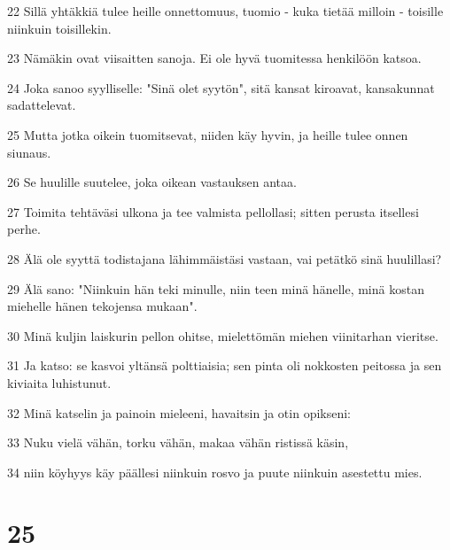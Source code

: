 \par 22 Sillä yhtäkkiä tulee heille onnettomuus, tuomio - kuka tietää milloin - toisille niinkuin toisillekin.
\par 23 Nämäkin ovat viisaitten sanoja. Ei ole hyvä tuomitessa henkilöön katsoa.
\par 24 Joka sanoo syylliselle: "Sinä olet syytön", sitä kansat kiroavat, kansakunnat sadattelevat.
\par 25 Mutta jotka oikein tuomitsevat, niiden käy hyvin, ja heille tulee onnen siunaus.
\par 26 Se huulille suutelee, joka oikean vastauksen antaa.
\par 27 Toimita tehtäväsi ulkona ja tee valmista pellollasi; sitten perusta itsellesi perhe.
\par 28 Älä ole syyttä todistajana lähimmäistäsi vastaan, vai petätkö sinä huulillasi?
\par 29 Älä sano: "Niinkuin hän teki minulle, niin teen minä hänelle, minä kostan miehelle hänen tekojensa mukaan".
\par 30 Minä kuljin laiskurin pellon ohitse, mielettömän miehen viinitarhan vieritse.
\par 31 Ja katso: se kasvoi yltänsä polttiaisia; sen pinta oli nokkosten peitossa ja sen kiviaita luhistunut.
\par 32 Minä katselin ja painoin mieleeni, havaitsin ja otin opikseni:
\par 33 Nuku vielä vähän, torku vähän, makaa vähän ristissä käsin,
\par 34 niin köyhyys käy päällesi niinkuin rosvo ja puute niinkuin asestettu mies.

\chapter{25}

